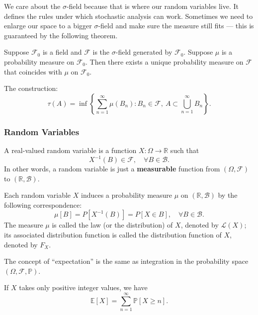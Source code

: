 \begin{rem}
    We care about the $\sigma$-field because that is where our random variables live. It defines the rules under which stochastic analysis can work. Sometimes we need to enlarge our space to a bigger $\sigma$-field and make sure the measure still fits — this is guaranteed by the following theorem.
\end{rem}


\begin{thm}
    Suppose \(\mathcal{F}_0\) is a field and \(\mathcal{F}\) is the \(\sigma\)-field generated by \(\mathcal{F}_0\). Suppose \(\mu\) is a probability measure on \(\mathcal{F}_0\). Then there exists a unique probability measure on \(\mathcal{F}\) that coincides with \(\mu\) on \(\mathcal{F}_0\).
\end{thm}

\begin{rem}
    The construction: 
    \[
    \tau(A)=\inf\left\{
    \sum_{n=1}^\infty \mu(B_n): B_n\in \mathcal{F}, \ A\subset\bigcup_{n=1}^\infty B_n
    \right\}.
    \]
\end{rem}



\subsubsection{Random Variables}
\begin{defn}
    A real-valued random variable is a function \( X: \Omega \to \mathbb{R} \) such that
    \[
    X^{-1}(B) \in \mathcal{F}, \quad \forall B \in \mathcal{B}.
    \]
    In other words, a random variable is just a \textbf{measurable} function from \( (\Omega, \mathcal{F}) \) to \( (\mathbb{R}, \mathcal{B}) \).
\end{defn}
\begin{defn}[Distribution]
    Each random variable \( X \) induces a probability measure \( \mu \) on \( (\mathbb{R}, \mathcal{B}) \) by the following correspondence:
    \[
    \mu[B] = P[X^{-1}(B)] = P[X \in B], \quad \forall B \in \mathcal{B}.
    \]
    The measure \( \mu \) is called the law (or the distribution) of \( X \), denoted by \( \mathcal{L}(X) \); its associated distribution function is called the distribution function of \( X \), denoted by \( F_X \).
\end{defn}
The concept of ``expectation'' is the same as integration in the probability space \( (\Omega, \mathcal{F}, \mathbb{P}) \).
\begin{cor}
    If \( X \) takes only positive integer values, we have
    \[
    \mathbb{E}[X] = \sum_{n=1}^{\infty} \mathbb{P}[X \geq n].
    \]
\end{cor}

